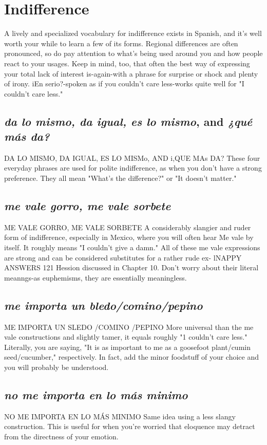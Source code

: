 \documentclass[14pt,a4paper,oneside]{memoir}
\begin{document}
\section{Indifference}
A lively and specialized vocabulary for indifference exists in
Spanish, and it's well worth your while to learn a few of its forms. Regional differences are often pronounced, so do pay attention to what's
being used around you and how people react to your usages. Keep in
mind, too, that often the best way of expressing your total lack of interest is-again-with a phrase for surprise or shock and plenty of
irony. iEn serio?-spoken as if you couldn't care less-works quite
well for "I couldn't care less."
\subsection{\emph{da lo mismo, da igual, es lo mismo}, and \emph{¿qué más da?}}
DA LO MISMO, DA IGUAL, ES LO MISMo, AND
i,QUE MAs DA?
These four everyday phrases are used for polite indifference, as
when you don't have a strong preference. They all mean "What's the
difference?" or "It doesn't matter."
\subsection{\emph{me vale gorro, me vale sorbete}}
ME VALE GORRO, ME VALE SORBETE
A considerably slangier and ruder form of indifference, especially in Mexico, where you will often hear Me vale by itself. It
roughly means "I couldn't give a damn." All of these me vale expressions are strong and can be considered substitutes for a rather rude ex-
lNAPPY ANSWERS 121
Hession discussed in Chapter 10. Don't worry about their literal meanngs-as euphemisms, they are essentially meaningless.
\subsection{\emph{me importa un bledo/comino/pepino}}
ME IMPORTA UN SLEDO /COMINO /PEPINO
More universal than the me vale constructions and slightly
tamer, it equals roughly "1 couldn't care less." Literally, you are saying,
"It is as important to me as a goosefoot plant/cumin seed/cucumber,"
respectively. In fact, add the minor foodstuff of your choice and you
will probably be understood.
\subsection{\emph{no me importa en lo más  minimo}}
NO ME IMPORTA EN LO MÁS MINIMO
Same idea using a less slangy construction. This is useful for
when you're worried that eloquence may detract from the directness of
your emotion.
\end{document}
